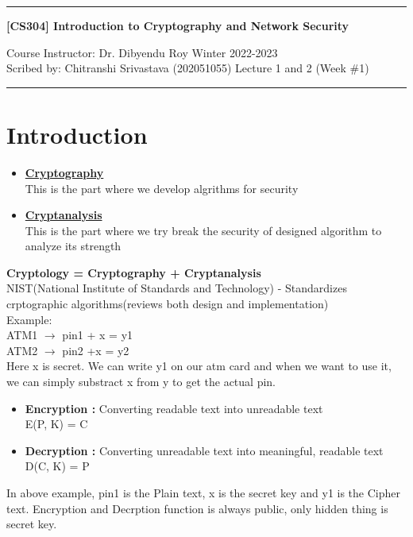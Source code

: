 \documentclass[11pt]{article}
\begin{document}
\noindent
\rule{\textwidth}{1pt}
\begin{center}
{\bf [CS304] Introduction to Cryptography and Network Security}
\end{center}
Course Instructor: Dr. Dibyendu Roy \hfill Winter 2022-2023\\
Scribed by: Chitranshi Srivastava (202051055) \hfill Lecture 1 and 2 (Week \#1)
\\
\rule{\textwidth}{1pt}
\section{Introduction}
\begin{itemize}
  \item \underline{\textbf{Cryptography}} \\
  This is the part where we develop algrithms for security
  \item \underline{\textbf{Cryptanalysis}} \\
  This is the part where we try break the security of designed algorithm to analyze its strength
\end{itemize}
\textbf{Cryptology = Cryptography + Cryptanalysis}\\
NIST(National Institute of Standards and Technology) - Standardizes crptographic algorithms(reviews both design and implementation)\\
Example:\\
ATM1 $\rightarrow$ pin1 + x = y1\\
ATM2 $\rightarrow$ pin2 +x = y2\\
Here x is secret. We can write y1 on our atm card and when we want to use it, we can simply substract x from y to get the actual pin.\\
\begin{itemize}
  \item \textbf{Encryption : } Converting readable text into unreadable text\\
  E(P, K) = C
  \item \textbf{Decryption : } Converting unreadable text into meaningful, readable text\\
  D(C, K) = P
\end{itemize}
In above example, pin1 is the Plain text, x is the secret key and y1 is the Cipher text. Encryption and Decrption function is always public, only hidden thing is secret key.\\
\end{document}
